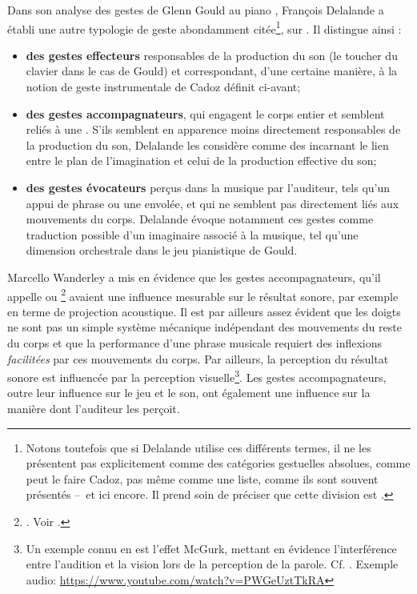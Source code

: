 \noindent Dans son analyse des gestes de Glenn Gould au piano \cite{delalande_geste_1988}, François Delalande a établi une autre typologie de geste abondamment citée\footnote{Notons toutefois que si Delalande utilise ces différents termes, il ne les présentent pas explicitement comme des catégories gestuelles absolues, comme peut le faire Cadoz, pas même comme une liste, comme ils sont souvent présentés --~et ici encore. Il prend soin de préciser que cette division est  \cite{delalande_geste_1988}.}, sur . Il distingue ainsi :
\vspace{-1em}
\begin{itemize}[noitemsep]
	\item \textbf{des gestes effecteurs} responsables de la production du son (le toucher du clavier dans le cas de Gould) et correspondant, d'une certaine manière, à la notion de geste instrumentale de Cadoz définit ci-avant;
	\item \textbf{des gestes accompagnateurs}, qui engagent le corps entier et semblent reliés à une . S'ils semblent en apparence moins directement responsables de la production du son, Delalande les considère comme des  incarnant le lien entre le plan de l'imagination et celui de la production effective du son;
	\item \textbf{des gestes évocateurs} perçus dans la musique par l'auditeur, tels qu'un appui de phrase ou une envolée, et qui ne semblent pas directement liés aux mouvements du corps. Delalande évoque notamment ces gestes comme traduction possible d'un imaginaire associé à la musique, tel qu'une dimension orchestrale dans le jeu pianistique de Gould.
\end{itemize}
\noindent Marcello Wanderley a mis en évidence que les gestes accompagnateurs, qu'il appelle  ou \footnote{. Voir \cite{wanderley_non-obvious_1999}.} avaient une influence mesurable sur le résultat sonore, par exemple en terme de projection acoustique. Il est par ailleurs assez évident que les doigts ne sont pas un simple système mécanique indépendant des mouvements du reste du corps et que la performance d'une phrase musicale requiert des inflexions \textit{facilitées} par ces mouvements du corps. Par ailleurs, la perception du résultat sonore est influencée par la perception visuelle\footnote{\label{fn:mcgurk} Un exemple connu en est l'effet McGurk, mettant en évidence l'interférence entre l'audition et la vision lors de la perception de la parole. Cf. \cite{macdonald_visual_1978}. Exemple audio: \url{https://www.youtube.com/watch?v=PWGeUztTkRA}}. Les gestes accompagnateurs, outre leur influence sur le jeu et le son, ont également une influence sur la manière dont l'auditeur les perçoit. 

